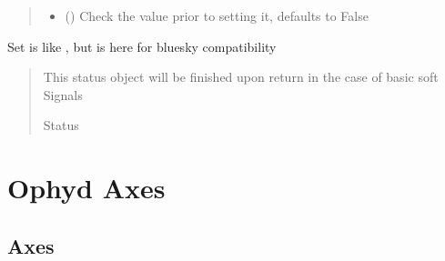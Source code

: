 \documentclass[letterpaper,10pt,english]{sphinxmanual}
\begin{document}
\begin{fulllineitems}
\begin{fulllineitems}
\begin{quote}
\begin{description}
\begin{itemize}
\item {} 
\sphinxAtStartPar
{} (\sphinxstyleliteralemphasis{\sphinxupquote{, }}) \textendash{} Check the value prior to setting it, defaults to False

\end{itemize}

\end{description}\end{quote}

\end{fulllineitems}


\begin{fulllineitems}
\label{\detokenize{API:raypyng_bluesky.signal.RayPySignalRO.set}}
\pysigstartsignatures
{}
\pysigstopsignatures
\sphinxAtStartPar
Set is like , but is here for bluesky compatibility
\begin{quote}\begin{description}
\sphinxAtStartPar
{} \textendash{} This status object will be finished upon return in the
case of basic soft Signals

\sphinxAtStartPar
Status

\end{description}\end{quote}

\end{fulllineitems}


\end{fulllineitems}



\section{Ophyd Axes}
\label{\detokenize{API:ophyd-axes}}

\subsection{Axes}
\label{\detokenize{API:axes}}
\end{document}
